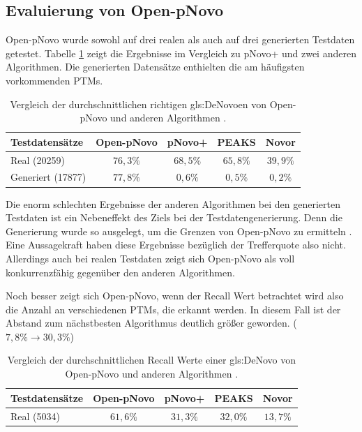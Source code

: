 \documentclass[a4paper, 12pt]{article}
\newcommand{\dashAndSpace}{\textendash \space}
\begin{document}
\subsection{Evaluierung von Open-pNovo}
Open-pNovo wurde sowohl auf drei realen als auch auf drei generierten Testdaten getestet. Tabelle \ref{tab:OpenPNovoResults} zeigt die Ergebnisse im Vergleich zu pNovo+ und zwei anderen Algorithmen. Die generierten Datensätze enthielten die am häufigsten vorkommenden PTMs.

\begin{table}[H]
    \hspace*{0.75cm}
    \centering
    \begin{tabular}{l|c|c|c|c}
        \toprule
        \textbf{Testdatensätze} & \textbf{Open-pNovo} & \textbf{pNovo+} &  \textbf{PEAKS} & \textbf{Novor} \\
        \midrule
        Real (20259) & $76,3 \%$ & $68,5 \%$ & $65,8 \%$ & $39,9 \%$ \\
        Generiert (17877) & $77,8 \%$ & $0,6 \%$ & $0,5 \%$ & $0,2 \%$ \\
        \bottomrule
    \end{tabular}
    \newline
    \caption{Vergleich der durchschnittlichen richtigen \gls{gls:DeNovo}en von Open-pNovo und anderen Algorithmen \cite[650]{OpenPNovo}.}
    \label{tab:OpenPNovoResults}
\end{table}

Die enorm schlechten Ergebnisse der anderen Algorithmen bei den generierten Testdaten ist ein Nebeneffekt des Ziels bei der Testdatengenerierung. Denn die Generierung wurde so ausgelegt, um die Grenzen von Open-pNovo zu ermitteln \cite[649]{OpenPNovo}. Eine Aussagekraft haben diese Ergebnisse bezüglich der Trefferquote also nicht. Allerdings auch bei realen Testdaten zeigt sich Open-pNovo als voll konkurrenzfähig gegenüber den anderen Algorithmen.

Noch besser zeigt sich Open-pNovo, wenn der Recall Wert betrachtet wird \dashAndSpace also die Anzahl an verschiedenen PTMs, die erkannt werden. In diesem Fall ist der Abstand zum nächstbesten Algorithmus deutlich größer geworden. ($ 7,8 \% \rightarrow 30,3 \% $)

\begin{table}[H]
    \hspace*{0.75cm}
    \centering
    \begin{tabular}{l|c|c|c|c}
        \toprule
        \textbf{Testdatensätze} & \textbf{Open-pNovo} & \textbf{pNovo+} & \textbf{PEAKS} & \textbf{Novor} \\
        \midrule
        Real (5034) & $61,6 \%$ & $31,3 \%$ & $32,0 \%$ & $13,7 \%$ \\
        \bottomrule
    \end{tabular}
    \newline
    \caption{Vergleich der durchschnittlichen Recall Werte einer \gls{gls:DeNovo} von Open-pNovo und anderen Algorithmen \cite[650]{OpenPNovo}.}
    \label{tab:OpenPNovoResultsRecall}
\end{table}
\end{document}
